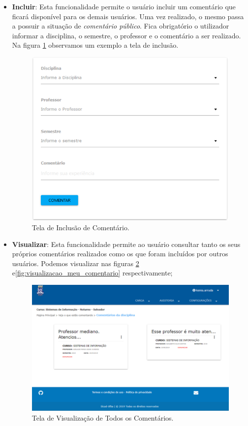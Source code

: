\documentclass[12pt, a4paper]{report}
\begin{document}
\begin{itemize}
\item \textbf{Incluir}: Esta funcionalidade permite o usuário incluir um comentário que ficará disponível para os demais usuários. Uma vez realizado, o mesmo passa a possuir a situação de \textit{comentário público}. Fica obrigatório o utilizador informar a disciplina, o semestre, o professor e o comentário a ser realizado. Na figura \ref{fig:incluir_comentario} observamos um exemplo a tela de inclusão.

\begin{figure}
\centering
\includegraphics[scale=0.6]{incluir_comentario.png}
\caption{Tela de Inclusão de Comentário.}
\label{fig:incluir_comentario}
\end{figure}

\item \textbf{Visualizar}: Esta funcionalidade permite ao usuário consultar tanto os seus próprios comentários realizados como os que foram incluídos por outros usuários. Podemos visualizar nas figuras \ref{fig:comentarios} e\ref{fig:visualizacao_meu_comentario} respectivamente; 

\begin{figure}
\centering
\includegraphics[scale=0.5]{comentarios.png}
\caption{Tela de Visualização de Todos os Comentários.}
\label{fig:comentarios}
\end{figure}


\end{itemize}
\end{document}
